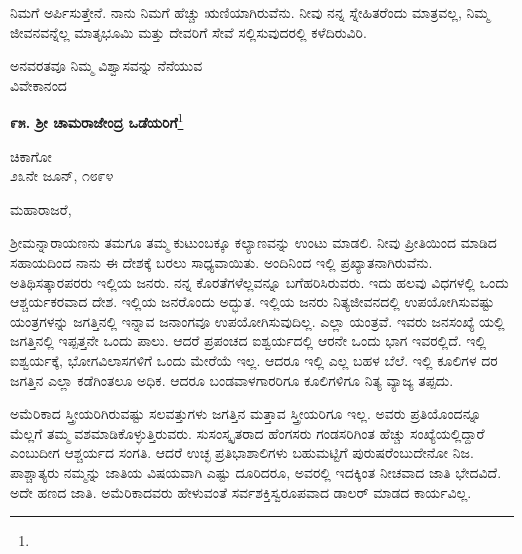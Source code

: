 ನಿಮಗೆ ಅರ್ಪಿಸುತ್ತೇನೆ. ನಾನು ನಿಮಗೆ ಹೆಚ್ಚು ಋಣಿಯಾಗಿರುವೆನು. ನೀವು ನನ್ನ ಸ್ನೇಹಿತರೆಂದು ಮಾತ್ರವಲ್ಲ, ನಿಮ್ಮ ಜೀವನವನ್ನೆಲ್ಲ ಮಾತೃಭೂಮಿ ಮತ್ತು ದೇವರಿಗೆ ಸೇವೆ ಸಲ್ಲಿಸುವುದರಲ್ಲಿ ಕಳೆದಿರುವಿರಿ.
\vspace{-0.5cm}

{\flushright
ಅನವರತವೂ ನಿಮ್ಮ ವಿಶ್ವಾಸವನ್ನು ನೆನೆಯುವ\\ವಿವೇಕಾನಂದ\par}
\vspace{-0.5cm}

\begin{center}
\textbf{೯೫. ಶ‍್ರೀ ಚಾಮರಾಜೇಂದ್ರ ಒಡೆಯರಿಗೆ}\footnote{}
\end{center}
\vspace{-0.5cm}

\begin{flushright}
ಚಿಕಾಗೋ\\೨೩ನೇ ಜೂನ್, ೧೮೯೪
\end{flushright}

\noindent
ಮಹಾರಾಜರೆ,

ಶ‍್ರೀಮನ್ನಾರಾಯಣನು ತಮಗೂ ತಮ್ಮ ಕುಟುಂಬಕ್ಕೂ ಕಲ್ಯಾಣವನ್ನು ಉಂಟು ಮಾಡಲಿ. ನೀವು ಪ್ರೀತಿಯಿಂದ ಮಾಡಿದ ಸಹಾಯದಿಂದ ನಾನು ಈ ದೇಶಕ್ಕೆ ಬರಲು ಸಾಧ್ಯವಾಯಿತು. ಅಂದಿನಿಂದ ಇಲ್ಲಿ ಪ್ರಖ್ಯಾತನಾಗಿರುವೆನು. ಅತಿಥಿಸತ್ಕಾರಪರರು ಇಲ್ಲಿಯ ಜನರು. ನನ್ನ ಕೊರತೆಗಳೆಲ್ಲವನ್ನೂ ಬಗೆಹರಿಸಿರುವರು. ಇದು ಹಲವು ವಿಧಗಳಲ್ಲಿ ಒಂದು ಆಶ್ಚರ್ಯಕರವಾದ ದೇಶ. ಇಲ್ಲಿಯ ಜನರೊಂದು ಅದ್ಭುತ. ಇಲ್ಲಿಯ ಜನರು ನಿತ್ಯಜೀವನದಲ್ಲಿ ಉಪಯೋಗಿಸುವಷ್ಟು ಯಂತ್ರಗಳನ್ನು ಜಗತ್ತಿನಲ್ಲಿ ಇನ್ನಾವ ಜನಾಂಗವೂ ಉಪಯೋಗಿಸುವುದಿಲ್ಲ. ಎಲ್ಲಾ ಯಂತ್ರವೆ. ಇವರು ಜನಸಂಖ್ಯೆ ಯಲ್ಲಿ ಜಗತ್ತಿನಲ್ಲಿ ಇಪ್ಪತ್ತನೇ ಒಂದು ಪಾಲು. ಆದರೆ ಪ್ರಪಂಚದ ಐಶ್ವರ್ಯದಲ್ಲಿ ಆರನೇ ಒಂದು ಭಾಗ ಇವರಲ್ಲಿದೆ. ಇಲ್ಲಿ ಐಶ್ವರ್ಯಕ್ಕೆ, ಭೋಗವಿಲಾಸಗಳಿಗೆ ಒಂದು ಮೇರೆಯೆ ಇಲ್ಲ. ಆದರೂ ಇಲ್ಲಿ ಎಲ್ಲ ಬಹಳ ಬೆಲೆ. ಇಲ್ಲಿ ಕೂಲಿಗಳ ದರ ಜಗತ್ತಿನ ಎಲ್ಲಾ ಕಡೆಗಿಂತಲೂ ಅಧಿಕ. ಆದರೂ ಬಂಡವಾಳಗಾರರಿಗೂ ಕೂಲಿಗಳಿಗೂ ನಿತ್ಯ ವ್ಯಾಜ್ಯ ತಪ್ಪದು.

ಅಮೆರಿಕಾದ ಸ್ತ್ರೀಯರಿಗಿರುವಷ್ಟು ಸಲವತ್ತುಗಳು ಜಗತ್ತಿನ ಮತ್ತಾವ ಸ್ತ್ರೀಯರಿಗೂ ಇಲ್ಲ. ಅವರು ಪ್ರತಿಯೊಂದನ್ನೂ ಮೆಲ್ಲಗೆ ತಮ್ಮ ವಶಮಾಡಿಕೊಳ್ಳುತ್ತಿರುವರು. ಸುಸಂಸ್ಕೃತರಾದ ಹೆಂಗಸರು ಗಂಡಸರಿಗಿಂತ ಹೆಚ್ಚು ಸಂಖ್ಯೆಯಲ್ಲಿದ್ದಾರೆ ಎಂಬುದೀಗ ಆಶ್ಚರ್ಯದ ಸಂಗತಿ. ಆದರೆ ಉಚ್ಛ ಪ್ರತಿಭಾಶಾಲಿಗಳು ಬಹುಮಟ್ಟಿಗೆ ಪುರುಷರೆಂಬುದೇನೋ ನಿಜ. ಪಾಶ್ಚಾತ್ಯರು ನಮ್ಮನ್ನು ಜಾತಿಯ ವಿಷಯವಾಗಿ ಎಷ್ಟು ದೂರಿದರೂ, ಅವರಲ್ಲಿ ಇದಕ್ಕಿಂತ ನೀಚವಾದ ಜಾತಿ ಭೇದವಿದೆ. ಅದೇ ಹಣದ ಜಾತಿ. ಅಮೆರಿಕಾದವರು ಹೇಳುವಂತೆ ಸರ್ವಶಕ್ತಿಸ್ವರೂಪವಾದ ಡಾಲರ್‌ ಮಾಡದ ಕಾರ್ಯವಿಲ್ಲ.

